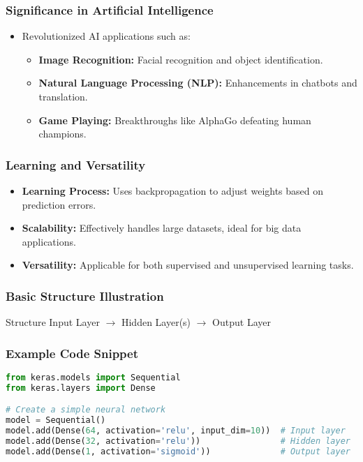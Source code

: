 \documentclass[aspectratio=169]{beamer}
\begin{document}
\begin{frame}[fragile]
    \frametitle{Significance in Artificial Intelligence}
    \begin{itemize}
        \item Revolutionized AI applications such as:
        \begin{itemize}
            \item \textbf{Image Recognition:} Facial recognition and object identification.
            \item \textbf{Natural Language Processing (NLP):} Enhancements in chatbots and translation.
            \item \textbf{Game Playing:} Breakthroughs like AlphaGo defeating human champions.
        \end{itemize}        
    \end{itemize}
\end{frame}

\begin{frame}[fragile]
    \frametitle{Learning and Versatility}
    \begin{itemize}
        \item \textbf{Learning Process:} Uses backpropagation to adjust weights based on prediction errors.
        \item \textbf{Scalability:} Effectively handles large datasets, ideal for big data applications.
        \item \textbf{Versatility:} Applicable for both supervised and unsupervised learning tasks.
    \end{itemize}
\end{frame}

\begin{frame}[fragile]
    \frametitle{Basic Structure Illustration}
    \begin{block}{Structure}
        \centering
        Input Layer $\rightarrow$ Hidden Layer(s) $\rightarrow$ Output Layer
    \end{block}
\end{frame}

\begin{frame}[fragile]
    \frametitle{Example Code Snippet}
    \begin{lstlisting}[language=Python]
from keras.models import Sequential
from keras.layers import Dense

# Create a simple neural network
model = Sequential()
model.add(Dense(64, activation='relu', input_dim=10))  # Input layer
model.add(Dense(32, activation='relu'))                # Hidden layer
model.add(Dense(1, activation='sigmoid'))              # Output layer
    \end{lstlisting}
\end{frame}
\end{document}
